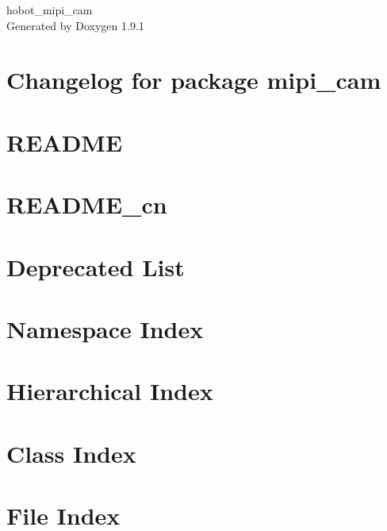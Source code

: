 \let\mypdfximage\pdfximage\def\pdfximage{\immediate\mypdfximage}\documentclass[twoside]{book}
\newcommand{\+}{\discretionary{\mbox{\scriptsize$\hookleftarrow$}}{}{}}
\newcommand{\clearemptydoublepage}{%
  \newpage{\pagestyle{empty}\cleardoublepage}%
}
\begin{document}
\raggedbottom

\hypersetup{pageanchor=false,
             bookmarksnumbered=true,
             pdfencoding=unicode
            }
\begin{titlepage}
\vspace*{7cm}
\begin{center}%
{\Large hobot\+\_\+mipi\+\_\+cam }\\
\vspace*{1cm}
{\large Generated by Doxygen 1.9.1}\\
\end{center}
\end{titlepage}
\clearemptydoublepage
{}
\tableofcontents
\clearemptydoublepage
{}
\hypersetup{pageanchor=true}

\chapter{Changelog for package mipi\+\_\+cam}
\label{md__c_h_a_n_g_e_l_o_g}

\chapter{README}
\label{md__r_e_a_d_m_e}

\chapter{README\+\_\+cn}
\label{md__r_e_a_d_m_e_cn}

\chapter{Deprecated List}
\label{deprecated}

\chapter{Namespace Index}

\chapter{Hierarchical Index}

\chapter{Class Index}

\chapter{File Index}

\end{document}
